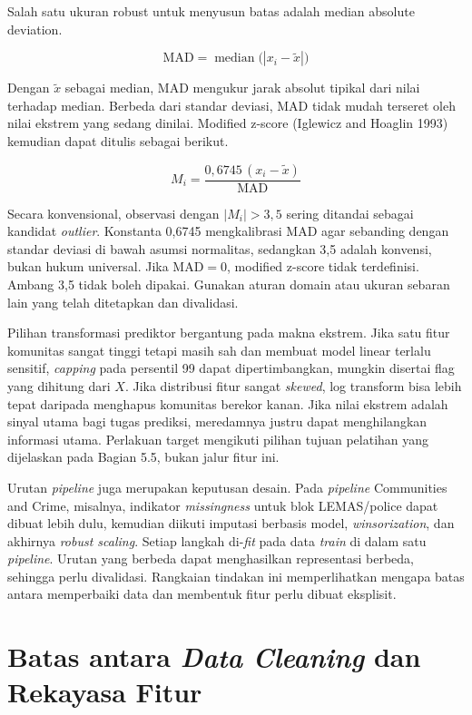 Salah satu ukuran robust untuk menyusun batas adalah median absolute deviation.

\[
\text{MAD} = \operatorname{median}\big(|x_i - \tilde{x}|\big)
\]

Dengan \(\tilde{x}\) sebagai median, MAD mengukur jarak absolut tipikal dari nilai terhadap median. Berbeda dari standar deviasi, MAD tidak mudah terseret oleh nilai ekstrem yang sedang dinilai. Modified z-score (Iglewicz and Hoaglin 1993) kemudian dapat ditulis sebagai berikut.

\[
M_i = \frac{0{,}6745\,(x_i - \tilde{x})}{\text{MAD}}
\]

Secara konvensional, observasi dengan \(|M_i| > 3{,}5\) sering ditandai sebagai kandidat \emph{outlier}. Konstanta 0,6745 mengkalibrasi MAD agar sebanding dengan standar deviasi di bawah asumsi normalitas, sedangkan 3,5 adalah konvensi, bukan hukum universal. Jika \(\text{MAD}=0\), modified z-score tidak terdefinisi. Ambang 3,5 tidak boleh dipakai. Gunakan aturan domain atau ukuran sebaran lain yang telah ditetapkan dan divalidasi.

Pilihan transformasi prediktor bergantung pada makna ekstrem. Jika satu fitur komunitas sangat tinggi tetapi masih sah dan membuat model linear terlalu sensitif, \emph{capping} pada persentil 99 dapat dipertimbangkan, mungkin disertai flag yang dihitung dari \(X\). Jika distribusi fitur sangat \emph{skewed}, log transform bisa lebih tepat daripada menghapus komunitas berekor kanan. Jika nilai ekstrem adalah sinyal utama bagi tugas prediksi, meredamnya justru dapat menghilangkan informasi utama. Perlakuan target mengikuti pilihan tujuan pelatihan yang dijelaskan pada Bagian 5.5, bukan jalur fitur ini.

Urutan \emph{pipeline} juga merupakan keputusan desain. Pada \emph{pipeline} Communities and Crime, misalnya, indikator \emph{missingness} untuk blok LEMAS/police dapat dibuat lebih dulu, kemudian diikuti imputasi berbasis model, \emph{winsorization}, dan akhirnya \emph{robust scaling}. Setiap langkah di-\emph{fit} pada data \emph{train} di dalam satu \emph{pipeline}. Urutan yang berbeda dapat menghasilkan representasi berbeda, sehingga perlu divalidasi. Rangkaian tindakan ini memperlihatkan mengapa batas antara memperbaiki data dan membentuk fitur perlu dibuat eksplisit.

\section{\texorpdfstring{Batas antara \emph{Data Cleaning} dan Rekayasa Fitur}{Batas antara Data Cleaning dan Rekayasa Fitur}}\label{batas-antara-data-cleaning-dan-rekayasa-fitur}

